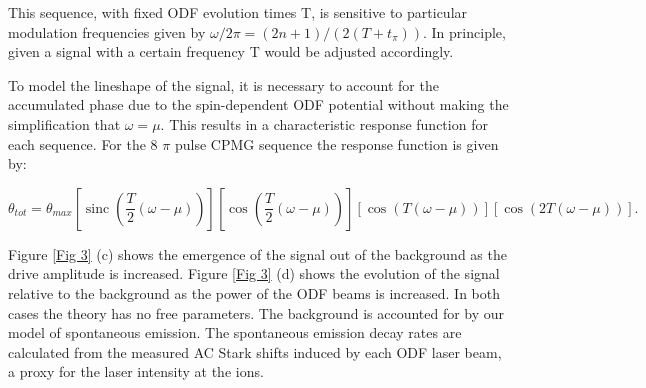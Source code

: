 \documentclass[aps,prl,twocolumn,groupedaddress,floatfix]{revtex4-1}
\DeclareMathOperator{\sinc}{sinc}
\begin{document}
This sequence, with fixed ODF evolution times T, is sensitive to particular modulation frequencies given by $ \omega/2\pi = (2n+1)/(2(T+t_{\pi}))$. In principle, given a signal with a certain frequency T would be adjusted accordingly.

To model the lineshape of the signal, it is necessary to account for the accumulated phase due to the spin-dependent ODF potential without making the simplification that $ \omega = \mu $. This results in a characteristic response function for each sequence. For the 8 $\pi$ pulse CPMG sequence the response function is given by:

\begin{widetext}
\begin{equation}
\theta_{tot} = \theta_{max} \left[ \sinc \left( \frac{T}{2} \left( \omega-\mu \right) \right) \right] 
\left[ \cos \left( \frac{T}{2} \left( \omega - \mu \right) \right) \right] \left[ \cos(T(\omega - \mu)) \right] \left[ \cos(2T(\omega - \mu)) \right] .
\end{equation}
\end{widetext}
Figure \ref{Fig 3} (c) shows the emergence of the signal out of the background as the drive amplitude is increased. Figure \ref{Fig 3} (d) shows the evolution of the signal relative to the background as the power of the ODF beams is increased. In both cases the theory has no free parameters. The background is accounted for by our model of spontaneous emission. The spontaneous emission decay rates are calculated from the measured AC Stark shifts induced by each ODF laser beam, a proxy for the laser intensity at the ions.
\end{document}
